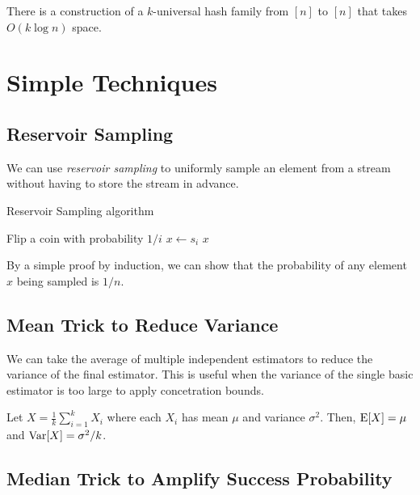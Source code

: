 \documentclass{article}
\begin{document}
\begin{lemma}
  There is a construction of a $k$-universal hash family from $[n]$ to $[n]$ that takes $O(k \log n)$ space.
\end{lemma}

\pagebreak

\section{Simple Techniques}

\subsection{Reservoir Sampling}

We can use \emph{reservoir sampling} to uniformly sample an element from a stream without having to store the stream in advance.

\begin{algorithm}
  \caption{Reservoir Sampling algorithm}
  \begin{algorithmic}[1]
    \State Flip a coin with probability $1/i$
    \State $x \leftarrow s_i$
    \EndIf
    \EndFor
    \State \Return $x$
    \EndProcedure
  \end{algorithmic}
\end{algorithm}

By a simple proof by induction, we can show that the probability of any element $x$ being sampled is $1/n$.

\subsection{Mean Trick to Reduce Variance}

We can take the average of multiple independent estimators to reduce the variance of the final estimator.
This is useful when the variance of the single basic estimator is too large to apply concetration bounds.

\begin{lemma}
  Let $X = \frac{1}{k} \sum_{i = 1}^{k} X_i$ where each $X_i$ has mean $\mu$ and variance $\sigma^2$.
  Then, $\operatorname{E}[X] = \mu$ and $\operatorname{Var}[X] = \sigma^2 / k$.
\end{lemma}

\subsection{Median Trick to Amplify Success Probability}
\end{document}

